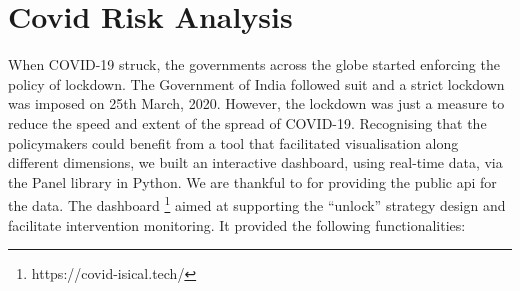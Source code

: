 \documentclass[letterpaper]{article} %
\begin{document}
	\section{Covid Risk Analysis}\label{dash}
	When COVID-19 struck, the governments across the globe started enforcing the policy of lockdown. The Government of India followed suit and a strict lockdown was imposed on 25th March, 2020. However, the lockdown was just a measure to reduce the speed and extent of the spread of COVID-19. Recognising that the policymakers could benefit from a tool that facilitated visualisation along different dimensions, we built an interactive dashboard, using real-time data, via the Panel library in Python. We are thankful to \citet{covid19indiaorg2020tracker} for providing the public api for the data. The dashboard \footnote{https://covid-isical.tech/} aimed at supporting the ``unlock'' strategy design and facilitate intervention monitoring. It provided the following functionalities:
\end{document}
